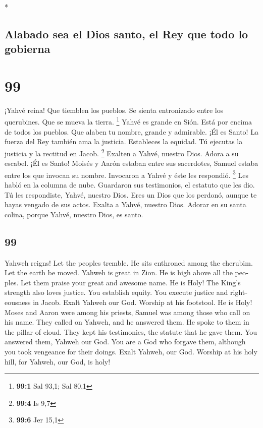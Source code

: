\begin{paracol}{2}
\begin{otherlanguage}{english}
\end{otherlanguage}

\switchcolumn[0]*

\hypertarget{alabado-sea-el-dios-santo-el-rey-que-todo-lo-gobierna}{%
\subsection{Alabado sea el Dios santo, el Rey que todo lo
gobierna}\label{alabado-sea-el-dios-santo-el-rey-que-todo-lo-gobierna}}

\hypertarget{section-196}{%
\section{99}\label{section-196}}

 ¡Yahvé reina! Que tiemblen los pueblos. Se sienta
entronizado entre los querubines. Que se mueva la tierra. \footnote{\textbf{99:1}
  Sal 93,1; Sal 80,1}  Yahvé es grande en Sión. Está por
encima de todos los pueblos.  Que alaben tu nombre, grande
y admirable. ¡Él es Santo!  La fuerza del Rey también ama
la justicia. Estableces la equidad. Tú ejecutas la justicia y la
rectitud en Jacob. \footnote{\textbf{99:4} Is 9,7} 
Exalten a Yahvé, nuestro Dios. Adora a su escabel. ¡Él es Santo!
 Moisés y Aarón estaban entre sus sacerdotes, Samuel
estaba entre los que invocan su nombre. Invocaron a Yahvé y éste les
respondió. \footnote{\textbf{99:6} Jer 15,1}  Les habló en
la columna de nube. Guardaron sus testimonios, el estatuto que les dio.
 Tú les respondiste, Yahvé, nuestro Dios. Eres un Dios que
los perdonó, aunque te hayas vengado de sus actos.  Exalta
a Yahvé, nuestro Dios. Adorar en su santa colina, porque Yahvé, nuestro
Dios, es santo.

\switchcolumn
\begin{otherlanguage}{english}

\hypertarget{section-197}{%
\section{99}\label{section-197}}

 Yahweh reigns! Let the peoples tremble. He sits enthroned
among the cherubim. Let the earth be moved.  Yahweh is
great in Zion. He is high above all the peoples.  Let them
praise your great and awesome name. He is Holy!  The
King's strength also loves justice. You establish equity. You execute
justice and righteousness in Jacob.  Exalt Yahweh our God.
Worship at his footstool. He is Holy!  Moses and Aaron
were among his priests, Samuel was among those who call on his name.
They called on Yahweh, and he answered them.  He spoke to
them in the pillar of cloud. They kept his testimonies, the statute that
he gave them.  You answered them, Yahweh our God. You are
a God who forgave them, although you took vengeance for their doings.
 Exalt Yahweh, our God. Worship at his holy hill, for
Yahweh, our God, is holy!


\end{otherlanguage}
\end{paracol}
